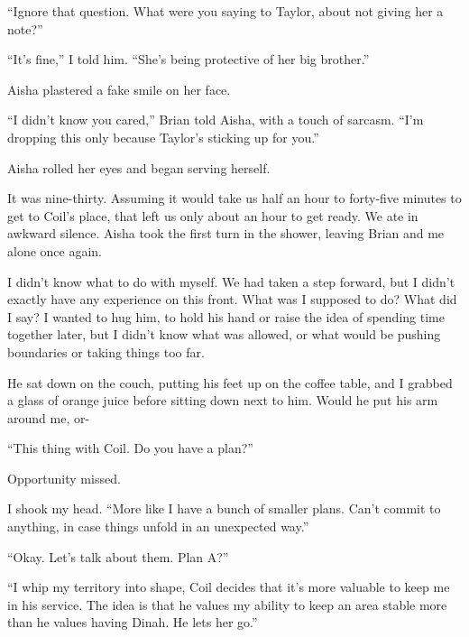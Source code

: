 ``Ignore that question.  What were you saying to Taylor, about not giving her a note?''



``It's fine,'' I told him.  ``She's being protective of her big brother.''



Aisha plastered a fake smile on her face.



``I didn't know you cared,'' Brian told Aisha, with a touch of sarcasm.  ``I'm dropping this only because Taylor's sticking up for you.''



Aisha rolled her eyes and began serving herself.



It was nine-thirty.  Assuming it would take us half an hour to forty-five minutes to get to Coil's place, that left us only about an hour to get ready.  We ate in awkward silence.  Aisha took the first turn in the shower, leaving Brian and me alone once again.



I didn't know what to do with myself.  We had taken a step forward, but I didn't exactly have any experience on this front.  What was I supposed to do?  What did I say?  I wanted to hug him, to hold his hand or raise the idea of spending time together later, but I didn't know what was allowed, or what would be pushing boundaries or taking things too far.



He sat down on the couch, putting his feet up on the coffee table, and I grabbed a glass of orange juice before sitting down next to him.  Would he put his arm around me, or-



``This thing with Coil.  Do you have a plan?''



Opportunity missed.



I shook my head.  ``More like I have a bunch of smaller plans.  Can't commit to anything, in case things unfold in an unexpected way.''



``Okay.  Let's talk about them.  Plan A?''



``I whip my territory into shape, Coil decides that it's more valuable to keep me in his service.  The idea is that he values my ability to keep an area stable more than he values having Dinah.  He lets her go.''



